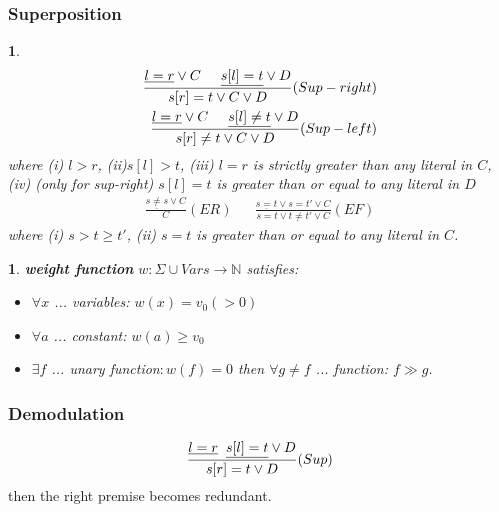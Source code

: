 \documentclass[9pt]{extarticle}
\theoremstyle{theoremstyle}
\newtheorem*{green}{}
\newtheorem*{blue}{}
\begin{document}
\begin{multicols}{3}
\begin{minipage}[t]{.30\textwidth}
\subsubsection*{Superposition}
\begin{blue}
\begin{align*}
	\frac{\underline{l=r} \lor C \hspace{.5cm} \underline{s[l]=t} \lor D}{s[r]=t \lor C \lor D} (Sup-right)\\
	\frac{\underline{l=r} \lor C \hspace{.5cm} \underline{s[l]\not=t} \lor D}{s[r]\not=t \lor C \lor D} (Sup-left)\\
\end{align*}
where (i) $l>r$, (ii)$s[l]>t$, (iii) $l=r$ is strictly greater than any literal in $C$, (iv) (only for sup-right) $s[l]=t$ is greater than or equal to any literal in $D$
\begin{align*}
	\frac{\underline{s\not= s} \lor C}{C} (ER) && \frac{\underline{s=t} \lor s=t' \lor C}{s=t \lor t\not= t' \lor C} (EF)
\end{align*}
where (i) $s>t\geq t'$, (ii) $s=t$ is greater than or equal to any literal in $C$.
\end{blue}

\begin{green}
	\textbf{weight function} $w:\Sigma \cup Vars \rightarrow \mathbb{N}$ satisfies:
	\begin{itemize}
		\item $\forall x$ ... variables: $ w(x) = v_0 (> 0)$
		\item $\forall a$ ... constant: $w(a) \geq v_0 $
		\item $\exists f$ ... unary function$: w(f)=0$ then $\forall g\not=f$ ... function: $f \gg g$.
	\end{itemize}
\end{green}

\end{minipage}\hfil

\begin{minipage}[t]{.30\textwidth}


\subsubsection*{Demodulation}
\begin{align*}
	\frac{\underline{l=r} \hspace{0.2cm} \underline{s[l]=t} \lor D}{s[r]=t \lor D}(Sup)
\end{align*}
then the right premise becomes redundant.


\end{minipage}
\end{multicols}
\end{document}

